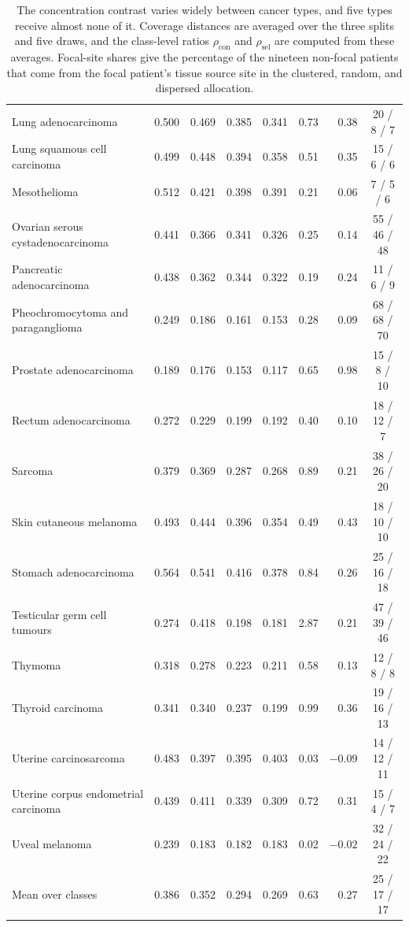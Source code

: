 \begin{table}[htbp]
\begin{tabular}{@{}lrrrrrrc@{}}
Lung adenocarcinoma & 0.500 & 0.469 & 0.385 & 0.341 & 0.73 & 0.38 & 20 / 8 / 7 \\
Lung squamous cell carcinoma & 0.499 & 0.448 & 0.394 & 0.358 & 0.51 & 0.35 & 15 / 6 / 6 \\
Mesothelioma & 0.512 & 0.421 & 0.398 & 0.391 & 0.21 & 0.06 & 7 / 5 / 6 \\
Ovarian serous cystadenocarcinoma & 0.441 & 0.366 & 0.341 & 0.326 & 0.25 & 0.14 & 55 / 46 / 48 \\
Pancreatic adenocarcinoma & 0.438 & 0.362 & 0.344 & 0.322 & 0.19 & 0.24 & 11 / 6 / 9 \\
Pheochromocytoma and paraganglioma & 0.249 & 0.186 & 0.161 & 0.153 & 0.28 & 0.09 & 68 / 68 / 70 \\
Prostate adenocarcinoma & 0.189 & 0.176 & 0.153 & 0.117 & 0.65 & 0.98 & 15 / 8 / 10 \\
Rectum adenocarcinoma & 0.272 & 0.229 & 0.199 & 0.192 & 0.40 & 0.10 & 18 / 12 / 7 \\
Sarcoma & 0.379 & 0.369 & 0.287 & 0.268 & 0.89 & 0.21 & 38 / 26 / 20 \\
Skin cutaneous melanoma & 0.493 & 0.444 & 0.396 & 0.354 & 0.49 & 0.43 & 18 / 10 / 10 \\
Stomach adenocarcinoma & 0.564 & 0.541 & 0.416 & 0.378 & 0.84 & 0.26 & 25 / 16 / 18 \\
Testicular germ cell tumours & 0.274 & 0.418 & 0.198 & 0.181 & 2.87 & 0.21 & 47 / 39 / 46 \\
Thymoma & 0.318 & 0.278 & 0.223 & 0.211 & 0.58 & 0.13 & 12 / 8 / 8 \\
Thyroid carcinoma & 0.341 & 0.340 & 0.237 & 0.199 & 0.99 & 0.36 & 19 / 16 / 13 \\
Uterine carcinosarcoma & 0.483 & 0.397 & 0.395 & 0.403 & 0.03 & $-0.09$ & 14 / 12 / 11 \\
Uterine corpus endometrial carcinoma & 0.439 & 0.411 & 0.339 & 0.309 & 0.72 & 0.31 & 15 / 4 / 7 \\
Uveal melanoma & 0.239 & 0.183 & 0.182 & 0.183 & 0.02 & $-0.02$ & 32 / 24 / 22 \\
\midrule
Mean over classes & 0.386 & 0.352 & 0.294 & 0.269 & 0.63 & 0.27 & 25 / 17 / 17 \\
\bottomrule
\end{tabular}
\caption{The concentration contrast varies widely between cancer types, and five types receive almost none of it. Coverage distances are averaged over the three splits and five draws, and the class-level ratios $\rho_{\mathrm{con}}$ and $\rho_{\mathrm{sel}}$ are computed from these averages. Focal-site shares give the percentage of the nineteen non-focal patients that come from the focal patient's tissue source site in the clustered, random, and dispersed allocation.}
\label{tab:class-check}
\end{table}
